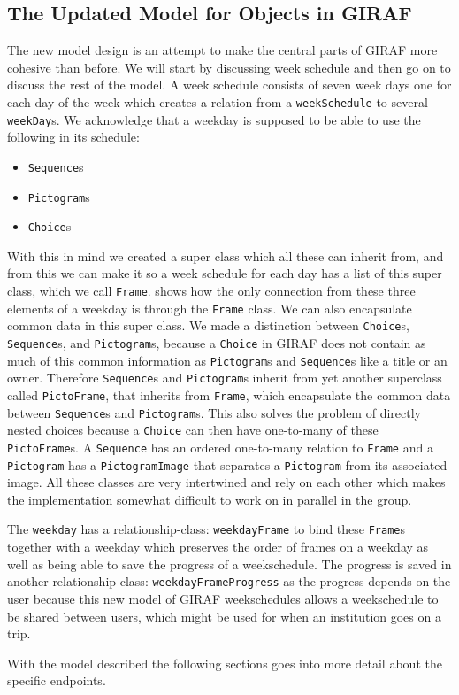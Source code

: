 \subsection{The Updated Model for Objects in GIRAF}\label{subsec:model}
The new model design is an attempt to make the central parts of GIRAF more cohesive than before.
We will start by discussing week schedule and then go on to discuss the rest of the model.
 A week schedule consists of seven week days one for each day of the week which creates a relation from a \texttt{weekSchedule} to several \texttt{weekDay}s.
We acknowledge that a weekday is supposed to be able to use the following in its schedule:
\begin{itemize}
	\item \texttt{Sequence}s
	\item \texttt{Pictogram}s
	\item \texttt{Choice}s
\end{itemize}
With this in mind we created a super class which all these can inherit from, and from this we can make it so a week schedule for each day has a list of this super class, which we call \texttt{Frame}.
 shows how the only connection from these three elements of a weekday is through the \texttt{Frame} class.
We can also encapsulate common data in this super class.
We made a distinction between \texttt{Choice}s, \texttt{Sequence}s, and \texttt{Pictogram}s, because a \texttt{Choice} in GIRAF does not contain as much of this common information as \texttt{Pictogram}s and \texttt{Sequence}s like a title or an owner.
Therefore \texttt{Sequence}s and \texttt{Pictogram}s inherit from yet another superclass called \texttt{PictoFrame}, that inherits from \texttt{Frame}, which encapsulate the common data between \texttt{Sequence}s and \texttt{Pictogram}s.
This also solves the problem of directly nested choices because a \texttt{Choice} can then have one-to-many of these \texttt{PictoFrame}s.
A \texttt{Sequence} has an ordered one-to-many relation to \texttt{Frame} and a \texttt{Pictogram} has a \texttt{PictogramImage} that separates a \texttt{Pictogram} from its associated image.
All these classes are very intertwined and rely on each other which makes the implementation somewhat difficult to work on in parallel in the group.

The \texttt{weekday} has a relationship-class: \texttt{weekdayFrame} to bind these \texttt{Frame}s together with a weekday which preserves the order of frames on a weekday as well as being able to save the progress of a weekschedule.
The progress is saved in another relationship-class: \texttt{weekdayFrameProgress} as the progress depends on the user because this new model of GIRAF weekschedules allows a weekschedule to be shared between users, which might be used for when an institution goes on a trip.

With the model described the following sections goes into more detail about the specific endpoints.
